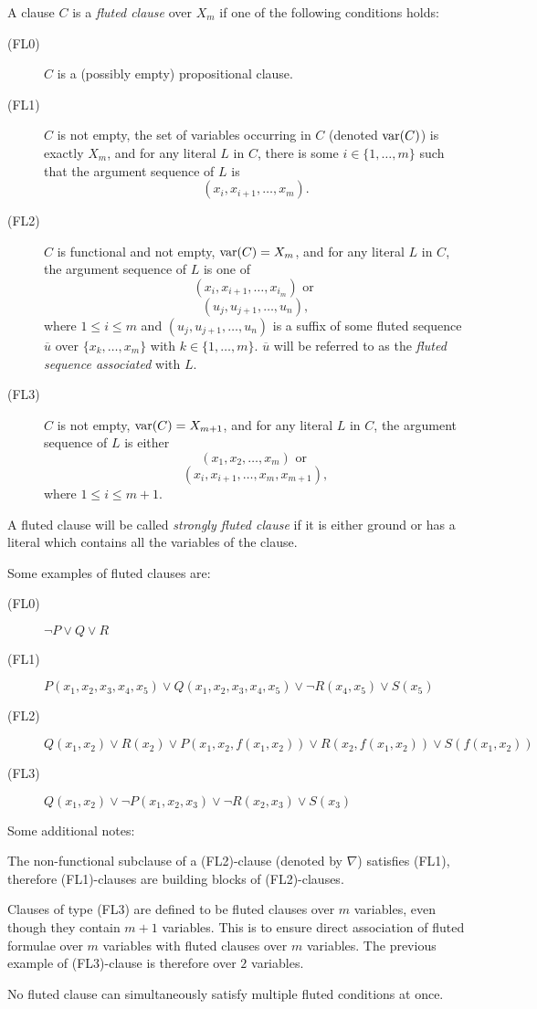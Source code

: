 \begin{definition}\label{def:fluted-clauses}
  A clause \(C\) is a \emph{fluted clause} over \(X_m\) if one of the following conditions holds:
  \begin{description}
    \item[(FL0)] \(C\) is a (possibly empty) propositional clause.
    \item[(FL1)] \(C\) is not empty, the set of variables occurring in \(C\) (denoted \(\text{var} (C)\)) is exactly \(X_m\), and for any literal \(L\) in \(C\), there is some \(i \in \{1,\ldots,m\}\) such that the argument sequence of \(L\) is
      \[(x_i, x_{i+1}, \ldots, x_m).\]
    \item[(FL2)] \(C\) is functional and not empty, \(\text{var} (C) = X_m\), and for any literal \(L\) in \(C\), the argument sequence of \(L\) is one of
      \[(x_{i},x_{i+1}, \ldots, x_{i_m}) \text{ or }\]
      \[(u_j, u_{j+1}, \ldots, u_{n}),\]
    where \(1 \leq i \leq m\) and \((u_j, u_{j+1}, \ldots, u_{n})\) is a suffix of some fluted sequence \(\overline{u}\) over \( \{x_k, \ldots, x_m\}\) with \(k \in \{1,\ldots,m\}\).
    \(\overline{u}\) will be referred to as the \emph{fluted sequence associated} with \(L\).
    \item[(FL3)] \(C\) is not empty, \(\text{var} (C) = X_{m+1}\), and for any literal \(L\) in \(C\), the argument sequence of \(L\) is either
      \[(x_{1},x_{2}, \ldots, x_{m}) \text{ or }\]
      \[(x_{i},x_{i+1}, \ldots, x_{m},x_{m+1}),\]
    where \(1 \leq i \leq m+1\).
  \end{description}
  A fluted clause will be called \emph{strongly fluted clause} if it is either ground or has a literal which contains all the variables of the clause.
\end{definition}
Some examples of fluted clauses are:
\begin{description}
  \item[(FL0)] \(\neg P \lor Q \lor R\)
  \item[(FL1)] \(P(x_1,x_2,x_3,x_4,x_5) \lor Q(x_1,x_2,x_3,x_4,x_5) \lor \neg R(x_4,x_5) \lor S(x_5)\)
  \item[(FL2)] \(Q(x_1,x_2) \lor R(x_2) \lor P(x_1,x_2,f(x_1,x_2))\lor R(x_2,f(x_1,x_2)) \lor S(f(x_1,x_2))\)
  \item[(FL3)] \(Q(x_1,x_2) \lor \neg P(x_1,x_2,x_3) \lor \neg R(x_2,x_3) \lor S(x_3)\)
\end{description}

Some additional notes:
\begin{enumerate*}[label= (\alph*)]
  \item The non-functional subclause of a (FL2)-clause (denoted by \(\nabla\)) satisfies (FL1), therefore (FL1)-clauses are building blocks of (FL2)-clauses.
  \item Clauses of type (FL3) are defined to be fluted clauses over \(m\) variables, even though they contain \(m+1\) variables. This is to ensure direct association of fluted formulae over \(m\) variables with fluted clauses over \(m\) variables. The previous example of (FL3)-clause is therefore over \(2\) variables.
  \item No fluted clause can simultaneously satisfy multiple fluted conditions at once.
\end{enumerate*}

